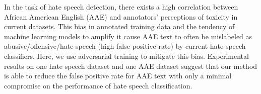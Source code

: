 In the task of hate speech detection, there exists a high correlation between African American English (AAE) and annotators' perceptions of toxicity in current datasets. This bias in annotated training data and the tendency of machine learning models to amplify it cause AAE text to often be mislabeled as abusive/offensive/hate speech (high false positive rate) by current hate speech classifiers. Here, we use adversarial training to mitigate this bias. Experimental results on one hate speech dataset and one AAE dataset suggest that our method is able to reduce the false positive rate for AAE text with only a minimal compromise on the performance of hate speech classification.
